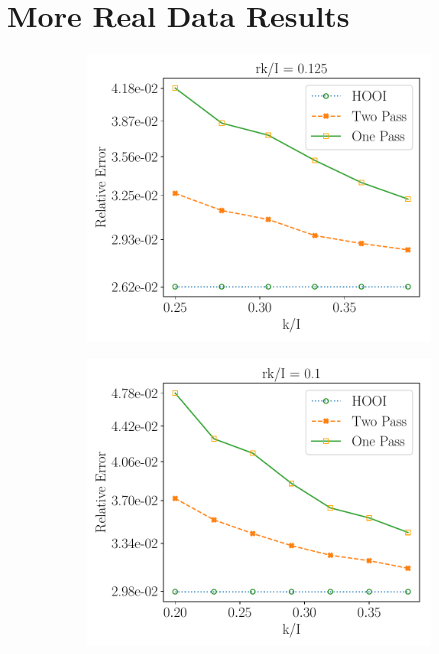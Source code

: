 \section{More Real Data Results}\label{appendix: more_real_data_result}
\begin{figure}[H]
    \centering
    \begin{subfigure}{0.32\textwidth}
    \includegraphics[scale = 0.3]{figure/SRFRAD_frk8.pdf}
    \end{subfigure}
    \begin{subfigure}{0.32\textwidth}
    \includegraphics[scale = 0.3]{figure/SRFRAD_frk10.pdf}

\end{subfigure}
\end{figure}
